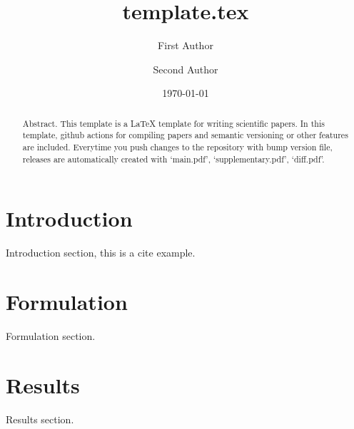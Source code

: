 \documentclass[twocolumn,prb]{revtex4-2}
\begin{document}


\title{template.tex}

\author{First Author}
\author{Second Author}

\date{\today}

\begin{abstract}
  Abstract. This template is a LaTeX template for writing scientific papers.
  In this template, github actions for compiling papers and semantic versioning or other features are included.
  Everytime you push changes to the repository with bump version file, releases are automatically created with `main.pdf', `supplementary.pdf', `diff.pdf'.
\end{abstract}

\maketitle

\section{Introduction}
\label{sec:introduction}
Introduction section, this is a cite example\cite{example2024}.

\section{Formulation}
\label{sec:Formulation}
Formulation section.

\section{Results}
\label{sec:results}
Results section.

\end{document}
